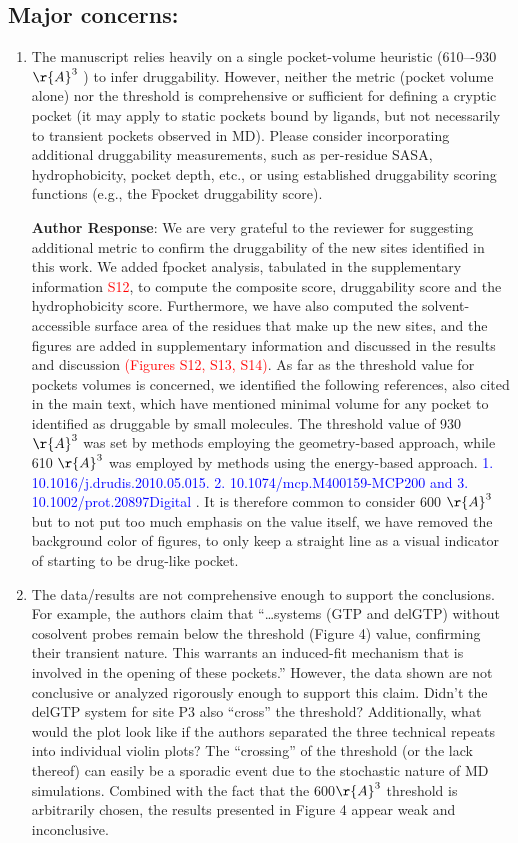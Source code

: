 \documentclass[11pt, a4paper]{article}
\begin{document}
\subsection{Major concerns:}
\begin{enumerate}
    \item The manuscript relies heavily on a single pocket-volume heuristic (610–-930 $\r{A}^3$  ) to infer druggability. However, neither the metric (pocket volume alone) nor the threshold is comprehensive or sufficient for defining a cryptic pocket (it may apply to static pockets bound by ligands, but not necessarily to transient pockets observed in MD). Please consider incorporating additional druggability measurements, such as per-residue SASA, hydrophobicity, pocket depth, etc., or using established druggability scoring functions (e.g., the Fpocket druggability score).

\textbf{Author Response}: We are very grateful to the reviewer for suggesting additional metric to confirm the druggability of the new sites identified in this work. We added fpocket analysis, tabulated in the supplementary information \textcolor{red}{S12}, to compute the composite score, druggability score and the hydrophobicity score. Furthermore, we have also computed the solvent-accessible surface area of the residues that make up the new sites, and the figures are added in supplementary information and discussed in the results and discussion \textcolor{red}{(Figures S12, S13, S14)}. As far as the threshold value for pockets volumes is concerned, we identified the following references, also cited in the main text, which have mentioned minimal volume for any pocket to identified as druggable by small molecules. The threshold value of 930 $\r{A}^3$ was set by methods employing the geometry-based approach, while 610 $\r{A}^3$ was employed by methods using the energy-based approach.
\textcolor{blue}{1. 10.1016/j.drudis.2010.05.015. 2.  10.1074/mcp.M400159-MCP200 and 3. 10.1002/prot.20897Digital }. It is therefore common to consider 600  $\r{A}^3$ but to not put too much emphasis on the value itself, we have removed the background color of figures, to only keep a straight line as a visual indicator of starting to be drug-like pocket.



    \item The data/results are not comprehensive enough to support the conclusions. For example, the authors claim that “…systems (GTP and delGTP) without cosolvent probes remain below the threshold (Figure 4) value, confirming their transient nature. This warrants an induced-fit mechanism that is involved in the opening of these pockets.” However, the data shown are not conclusive or analyzed rigorously enough to support this claim. Didn’t the delGTP system for site P3 also “cross” the threshold? Additionally, what would the plot look like if the authors separated the three technical repeats into individual violin plots? The “crossing” of the threshold (or the lack thereof) can easily be a sporadic event due to the stochastic nature of MD simulations. Combined with the fact that the 600$\r{A}^3$ threshold is arbitrarily chosen, the results presented in Figure 4 appear weak and inconclusive.


\end{enumerate}
\end{document}
